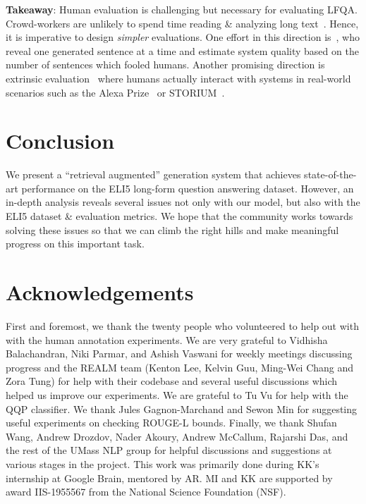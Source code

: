 \documentclass[11pt]{article}
\begin{document}
\noindent \textbf{Takeaway}: Human evaluation is challenging but necessary for evaluating LFQA. Crowd-workers are unlikely to spend time reading \& analyzing long text~\citep{akoury2020storium}. Hence, it is imperative to design \emph{simpler} evaluations. One effort in this direction is~\citet{dugan-etal-2020-roft}, who reveal one generated sentence at a time and estimate system quality based on the number of sentences which fooled humans. Another promising direction is extrinsic evaluation~\citep{celikyilmaz2020evaluation} where humans actually interact with systems in real-world scenarios such as the Alexa Prize~\citep{ram2018conversational} or STORIUM~\citep{akoury2020storium}.
 \section{Conclusion}

We present a ``retrieval augmented'' generation system that achieves state-of-the-art performance on the ELI5 long-form question answering dataset. However, an in-depth analysis reveals several issues not only with our model, but also with the ELI5 dataset \& evaluation metrics. We hope that the community works towards solving these issues so that we can climb the right hills and make meaningful progress on this important task.

\section*{Acknowledgements}

First and foremost, we thank the twenty people who volunteered to help out with with the human annotation experiments. We are very grateful to Vidhisha Balachandran, Niki Parmar, and Ashish Vaswani for weekly meetings discussing progress and the REALM team (Kenton Lee, Kelvin Guu, Ming-Wei Chang and Zora Tung) for help with their codebase and several useful discussions which helped us improve our experiments. We are grateful to Tu Vu for help with the QQP classifier. We thank Jules Gagnon-Marchand and Sewon Min for suggesting useful experiments on checking ROUGE-L bounds. Finally, we thank Shufan Wang, Andrew Drozdov, Nader Akoury, Andrew McCallum, Rajarshi Das, and the rest of the UMass NLP group for helpful discussions and suggestions at various stages in the project. This work was primarily done during KK's internship at Google Brain, mentored by AR. MI and KK are supported by award IIS-1955567 from the National Science Foundation (NSF).
\end{document}
